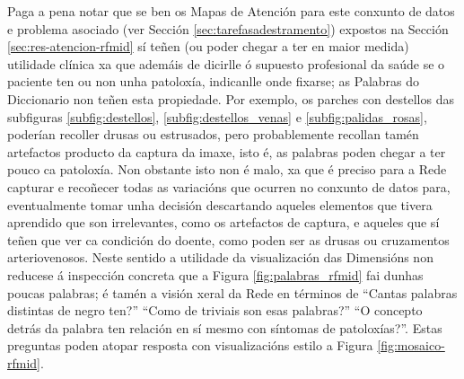 Paga a pena notar que se ben os Mapas de Atención para este conxunto de datos e problema asociado (ver Sección \ref{sec:tarefasadestramento}) expostos na Sección \ref{sec:res-atencion-rfmid} sí teñen (ou poder chegar a ter en maior medida) utilidade clínica xa que ademáis de dicirlle ó supuesto profesional da saúde se o paciente ten ou non unha patoloxía, indicanlle onde fixarse; as Palabras do Diccionario non teñen esta propiedade. Por exemplo, os parches con destellos das subfiguras \ref{subfig:destellos}, \ref{subfig:destellos_venas} e \ref{subfig:palidas_rosas}, poderían recoller drusas ou estrusados, pero probablemente recollan tamén artefactos producto da captura da imaxe, isto é, as palabras poden chegar a ter pouco ca patoloxía. Non obstante isto non é malo, xa que é preciso para a Rede capturar e recoñecer todas as variacións que ocurren no conxunto de datos para, eventualmente tomar unha decisión descartando aqueles elementos que tivera aprendido que son irrelevantes, como os artefactos de captura, e aqueles que sí teñen que ver ca condición do doente, como poden ser as drusas ou cruzamentos arteriovenosos. Neste sentido a utilidade da visualización das Dimensións non reducese á inspección concreta que a  Figura \ref{fig:palabras_rfmid} fai dunhas poucas palabras; é tamén a visión xeral da Rede en términos de ``Cantas palabras distintas de negro ten?'' ``Como de triviais son esas palabras?'' ``O concepto detrás da palabra ten relación en sí mesmo con síntomas de patoloxías?''. Estas preguntas poden atopar resposta con visualizacións estilo a Figura \ref{fig:mosaico-rfmid}.

%

